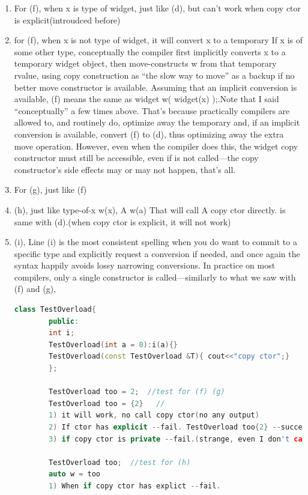 \documentclass[a4paper,12pt,twoside]{book}
\begin{document}
\begin{itemize}
\begin{enumerate}
		\item For (f), when x is type of widget, just like (d), but can't work when copy ctor is explicit(introudced before)
		
		\item for (f), when x is not type of widget, it will convert x to a temporary If x is of some other type, conceptually the compiler first implicitly converts x to a temporary widget object, then move-constructs w from that temporary rvalue, using copy construction as “the slow way to move” as a backup if no better move constructor is available. Assuming that an implicit conversion is available, (f) means the same as widget w( widget(x) );.Note that I said “conceptually” a few times above. That’s because practically compilers are allowed to, and routinely do, optimize away the temporary and, if an implicit conversion is available, convert (f) to (d), thus optimizing away the extra move operation. However, even when the compiler does this, the widget copy constructor must still be accessible, even if is not called—the copy constructor’s side effects may or may not happen, that’s all.
		
		
		\item For (g), just like (f)
		
		\item (h), just like type-of-x w(x), A w(a) That will call A copy ctor directly. is same with (d).(when copy ctor is explicit, it will not work)
		
		\item (i), Line (i) is the most consistent spelling when you do want to commit to a specific type and explicitly request a conversion if needed, and once again the { } syntax happily avoids lossy narrowing conversions. In practice on most compilers, only a single constructor is called—similarly to what we saw with (f) and (g),
		
		\begin{lstlisting}[frame=single, language=c++,mathescape=true]
		class TestOverload{
		public:
		int i;
		TestOverload(int a = 0):i(a){}
		TestOverload(const TestOverload &T){ cout<<"copy ctor";} 
		};
		
		TestOverload too = 2;  //test for (f) (g)
		TestOverload too = {2}   //
		1) it will work, no call copy ctor(no any output)
		2) If ctor has explicit --fail. TestOverload too{2} --succeed.
		3) if copy ctor is private --fail.(strange, even I don't call you, but you must accessible)
		
		TestOverload too;  //test for (h)
		auto w = too
		1) When if copy ctor has explict --fail.
		

\end{lstlisting}
\end{enumerate}
\end{itemize}
\end{document}
